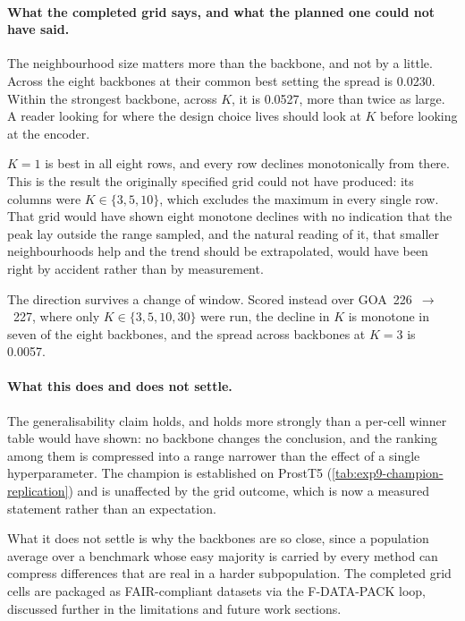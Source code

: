\paragraph{What the completed grid says, and what the planned one could not have said.}
The neighbourhood size matters more than the backbone, and not by a little. Across
the eight backbones at their common best setting the spread is 0.0230. Within the
strongest backbone, across $K$, it is 0.0527, more than twice as large. A reader
looking for where the design choice lives should look at $K$ before looking at
the encoder.

$K{=}1$ is best in all eight rows, and every row declines monotonically from
there. This is the result the originally specified grid could not have produced:
its columns were $K \in \{3, 5, 10\}$, which excludes the maximum in every single
row. That grid would have shown eight monotone declines with no indication that
the peak lay outside the range sampled, and the natural reading of it, that
smaller neighbourhoods help and the trend should be extrapolated, would have been
right by accident rather than by measurement.

The direction survives a change of window. Scored instead over
GOA~226~$\to$~227, where only $K \in \{3, 5, 10, 30\}$ were run, the decline in
$K$ is monotone in seven of the eight backbones, and the spread across backbones
at $K{=}3$ is 0.0057.

\paragraph{What this does and does not settle.}
The generalisability claim holds, and holds more strongly than a per-cell winner
table would have shown: no backbone changes the conclusion, and the ranking among
them is compressed into a range narrower than the effect of a single
hyperparameter. The champion is established on ProstT5
(\cref{tab:exp9-champion-replication}) and is unaffected by the grid outcome,
which is now a measured statement rather than an expectation.

What it does not settle is why the backbones are so close, since a population
average over a benchmark whose easy majority is carried by every method can
compress differences that are real in a harder subpopulation. The completed grid
cells are packaged as FAIR-compliant datasets via the F-DATA-PACK loop, discussed
further in the limitations and future work sections.

